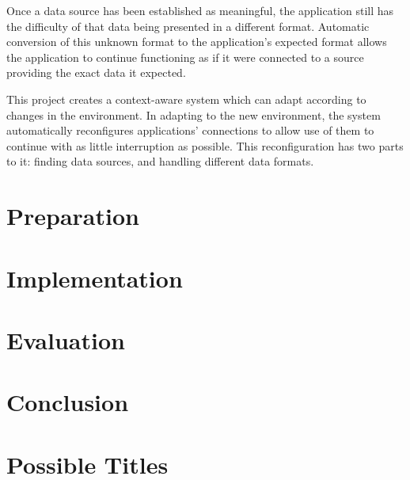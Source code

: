 \documentclass[12pt,twoside,notitlepage]{report}
\begin{document}
Once a data source has been established as meaningful, the application still has the difficulty of that data being presented in a different format.
Automatic conversion of this unknown format to the application's expected format allows the application to continue functioning as if it were connected to a source providing the exact data it expected.

This project creates a context-aware system which can adapt according to changes in the environment.\cite{Schilit:1994:CCA:1439278.1440041} 
In adapting to the new environment, the system automatically reconfigures applications' connections to allow use of them to continue with as little interruption as possible. 
This reconfiguration has two parts to it: finding data sources, and handling different data formats.



\cleardoublepage

 
\chapter{Preparation}


\cleardoublepage


\chapter{Implementation}


\cleardoublepage


\chapter{Evaluation}


\cleardoublepage


\chapter{Conclusion}


\cleardoublepage



\cleardoublepage

\appendix

\chapter{Possible Titles}
\end{document}
